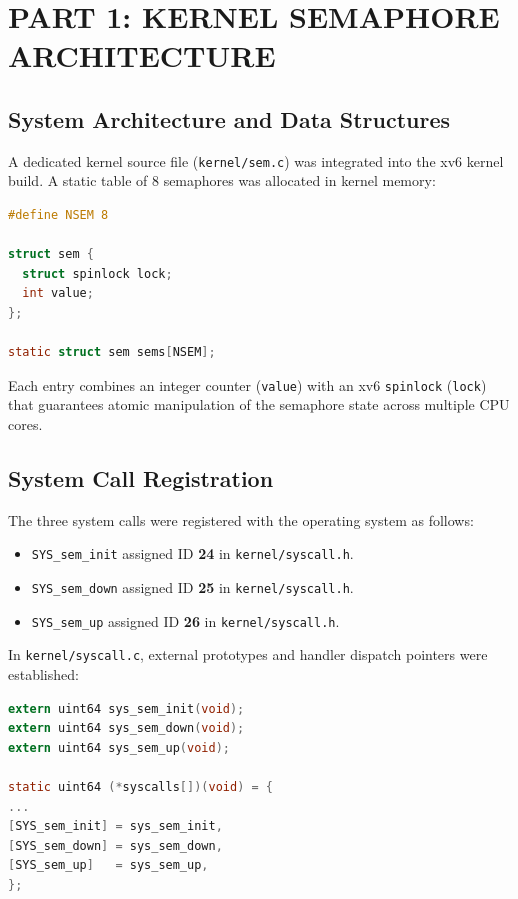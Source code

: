 \documentclass[12pt,a4paper]{report}
\numberwithin{equation}{chapter}
\numberwithin{figure}{chapter}
\numberwithin{table}{chapter}
\begin{document}
\chapter{PART 1: KERNEL SEMAPHORE ARCHITECTURE}

\section{System Architecture and Data Structures}
A dedicated kernel source file (\texttt{kernel/sem.c}) was integrated into the xv6 kernel build. A static table of 8 semaphores was allocated in kernel memory:

\begin{lstlisting}[language=C]
#define NSEM 8

struct sem {
  struct spinlock lock;
  int value;
};

static struct sem sems[NSEM];
\end{lstlisting}

Each entry combines an integer counter (\texttt{value}) with an xv6 \texttt{spinlock} (\texttt{lock}) that guarantees atomic manipulation of the semaphore state across multiple CPU cores.

\section{System Call Registration}
The three system calls were registered with the operating system as follows:
\begin{itemize}
    \item \texttt{SYS\_sem\_init} assigned ID \textbf{24} in \texttt{kernel/syscall.h}.
    \item \texttt{SYS\_sem\_down} assigned ID \textbf{25} in \texttt{kernel/syscall.h}.
    \item \texttt{SYS\_sem\_up} assigned ID \textbf{26} in \texttt{kernel/syscall.h}.
\end{itemize}

In \texttt{kernel/syscall.c}, external prototypes and handler dispatch pointers were established:
\begin{lstlisting}[language=C]
extern uint64 sys_sem_init(void);
extern uint64 sys_sem_down(void);
extern uint64 sys_sem_up(void);

static uint64 (*syscalls[])(void) = {
...
[SYS_sem_init] = sys_sem_init,
[SYS_sem_down] = sys_sem_down,
[SYS_sem_up]   = sys_sem_up,
};
\end{lstlisting}
\end{document}
